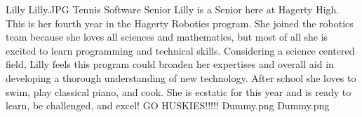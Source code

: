\insertbio
{Lilly}
{Lilly.JPG}
{Tennis}
{Software}
{Senior}
{
Lilly is a Senior here at Hagerty High. This is her fourth year in the Hagerty Robotics program. She joined the robotics team because she loves all sciences and mathematics, but most of all she is excited to learn programming and technical skills. Considering a science centered field, Lilly feels this program could broaden her expertises and overall aid in developing a thorough understanding of new technology. After school she loves to swim, play classical piano, and cook. She is ecstatic for this year and is ready to learn, be challenged, and excel! GO HUSKIES!!!!!
}
{Dummy.png}
{Dummy.png}